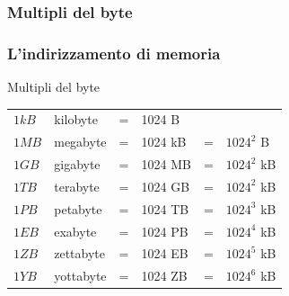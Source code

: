 \subsubsection[Multipli del byte]{Multipli del byte}
\begin{frame}
	\frametitle{L'indirizzamento di memoria}
	
	\begin{block}{Multipli del byte}
		\begin{table}[]
			\centering
			\begin{tabular}{llclcl}
			$1kB$ & kilobyte & = & 1024 B & &  \\
			$1MB$ & megabyte & = & 1024 kB & = & $1024^2$ B \\
			$1GB$ & gigabyte & = & 1024 MB & = & $1024^2$ kB \\
			$1TB$ & terabyte & = & 1024 GB & = & $1024^2$ kB \\
			$1PB$ & petabyte & = & 1024 TB & = & $1024^3$ kB \\
			$1EB$ & exabyte & = & 1024 PB & = & $1024^4$ kB \\
			$1ZB$ & zettabyte & = & 1024 EB & = & $1024^5$ kB \\
			$1YB$ & yottabyte & = & 1024 ZB & = & $1024^6$ kB \\
			\end{tabular}
		\end{table}		
	\end{block}
\end{frame}


